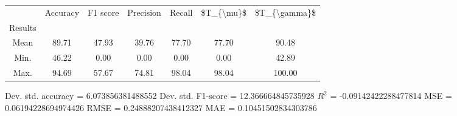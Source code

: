 \begin{tabular}{|c|c|c|c|c|c|c|}
\toprule
{} &  Accuracy &  F1 score &  Precision &  Recall &  \$T\_\{\textbackslash mu\}\$ &  \$T\_\{\textbackslash gamma\}\$ \\
Results &           &           &            &         &            &               \\
\hline
Mean    &     89.71 &     47.93 &      39.76 &   77.70 &      77.70 &         90.48 \\
Min.    &     46.22 &      0.00 &       0.00 &    0.00 &       0.00 &         42.89 \\
Max.    &     94.69 &     57.67 &      74.81 &   98.04 &      98.04 &        100.00 \\
\bottomrule
\end{tabular}

 Dev. std. accuracy = 6.073856381488552
 Dev. std. F1-score = 12.366664845735928
 $R^2$ = -0.09142422288477814
 MSE = 0.06194228694974426
 RMSE = 0.24888207438412327
 MAE = 0.10451502834303786
